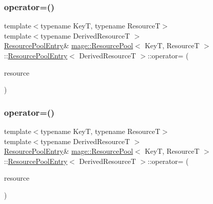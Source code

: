 \subsubsection{\texorpdfstring{operator=()}{operator=()}\hspace{0.1cm}{\footnotesize\ttfamily [1/2]}}
{\footnotesize\ttfamily template$<$typename KeyT, typename ResourceT$>$ \\
template$<$typename Derived\+ResourceT $>$ \\
\hyperlink{structmage_1_1_resource_pool_1_1_resource_pool_entry}{Resource\+Pool\+Entry}\& \hyperlink{classmage_1_1_resource_pool}{mage\+::\+Resource\+Pool}$<$ KeyT, ResourceT $>$\+::\hyperlink{structmage_1_1_resource_pool_1_1_resource_pool_entry}{Resource\+Pool\+Entry}$<$ Derived\+ResourceT $>$\+::operator= (\begin{DoxyParamCaption}\item[{const \hyperlink{structmage_1_1_resource_pool_1_1_resource_pool_entry}{Resource\+Pool\+Entry}$<$ Derived\+ResourceT $>$ \&}]{resource }\end{DoxyParamCaption})\hspace{0.3cm}{\ttfamily [delete]}}

\hypertarget{structmage_1_1_resource_pool_1_1_resource_pool_entry_ab9de5fdfecd8e19a510541b9353fe854}{}\label{structmage_1_1_resource_pool_1_1_resource_pool_entry_ab9de5fdfecd8e19a510541b9353fe854} 
\subsubsection{\texorpdfstring{operator=()}{operator=()}\hspace{0.1cm}{\footnotesize\ttfamily [2/2]}}
{\footnotesize\ttfamily template$<$typename KeyT, typename ResourceT$>$ \\
template$<$typename Derived\+ResourceT $>$ \\
\hyperlink{structmage_1_1_resource_pool_1_1_resource_pool_entry}{Resource\+Pool\+Entry}\& \hyperlink{classmage_1_1_resource_pool}{mage\+::\+Resource\+Pool}$<$ KeyT, ResourceT $>$\+::\hyperlink{structmage_1_1_resource_pool_1_1_resource_pool_entry}{Resource\+Pool\+Entry}$<$ Derived\+ResourceT $>$\+::operator= (\begin{DoxyParamCaption}\item[{\hyperlink{structmage_1_1_resource_pool_1_1_resource_pool_entry}{Resource\+Pool\+Entry}$<$ Derived\+ResourceT $>$ \&\&}]{resource }\end{DoxyParamCaption})\hspace{0.3cm}{\ttfamily [delete]}}



